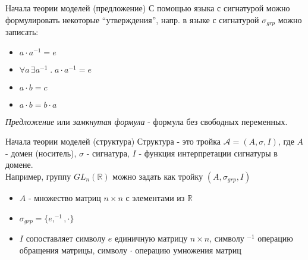 \documentclass{beamer}
\begin{document}
\begin{frame}{Начала теории моделей (предложение)}
С помощью языка с сигнатурой можно формулировать некоторые ``утверждения'', напр. в языке с сигнатурой $\sigma_{grp}$ можно записать:
  \begin{itemize}
    \item $a \cdot a^{-1} = e$
    \item $\forall a \, \exists a^{-1} \; . \; a \cdot a^{-1} = e$
    \item $a \cdot b = c$
    \item $a \cdot b = b \cdot a$
  \end{itemize}
\bigskip  
\textit{Предложение} или \textit{замкнутая формула} - формула без свободных переменных.
\end{frame}

\begin{frame}{Начала теории моделей (структура)}
Структура - это тройка $\mathcal{A} = (A, \sigma, I)$, где $A$ - домен (носитель), $\sigma$ - сигнатура, $I$ - функция интерпретации сигнатуры в домене.\\
\bigskip
Например, группу $GL_n(\mathbb{R})$ можно задать как тройку $(A, \sigma_{grp}, I)$\\
  \begin{itemize}
    \item $A$ - множество матриц $n \times n$ с элементами из $\mathbb{R}$
    \item $\sigma_{grp} = \{e, ^{-1}, \cdot\}$
    \item $I$ сопоставляет символу $e$ единичную матрицу $n \times n$, символу $^{-1}$ операцию обращения матрицы, символу $\cdot$ операцию умножения матриц
  \end{itemize}
\end{frame}

\end{document}
